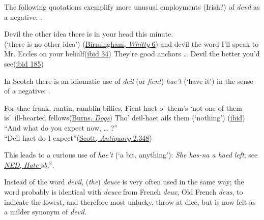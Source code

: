 The following quotations exemplify more unusual employments (Irish?) of \textit{devil} as a negative: .

\ea \label{ex:04-183}
\ea
Devil the other idea there is in your head this minute.\\(`there is no other idea') \hfill(\href{https://archive.org/details/advofdrwhitty00birmiala/page/n17/mode/2up?q=\%22Devil+the+other+idea+there\%22&view=theater}{Birmingham, \textit{Whitty} 6})
\ex
and devil the word I'll speak to Mr. Eccles on your behalf\hfill(\href{https://archive.org/details/advofdrwhitty00birmiala/page/34/mode/2up?q=\%22devil+the+word+I%27ll+speak%22}{ibid 34})
\ex
They're good anchors {\dots} Devil the better you'd see\hfill(\href{https://archive.org/details/advofdrwhitty00birmiala/page/184/mode/2up?q=%22They%27re+good+anchors%2C%22&view=theater}{ibid 185}) %
\z
\z

In Scotch there is an idiomatic use of \textit{deil} (or \textit{fient}) \textit{hae't} (`have it') in the sense of a negative: .

\ea \label{ex:04-186}
\ea
For thae frank, rantin, ramblin billies, Fient haet o' them's \ob`not one of them is'\cb ~ill-hearted fellows\hfill(\href{https://www.scottishpoetrylibrary.org.uk/poem/the-twa-dogs/}{Burns, \textit{Dogs}})
\ex
Tho' deil-haet ails them \phantom{x} (`nothing') \hfill(\href{https://www.scottishpoetrylibrary.org.uk/poem/the-twa-dogs/}{ibid}) %
\ex
``And what do you expect now, {\dots} ?''\\``Deil haet do I expect''\hfill(\href{https://archive.org/details/cewaverleynovels03scotuoft/page/406/mode/2up?view=theater&q=\%22what+do+you+expect+now%22}{Scott, \textit{Antiquary} 2.348}) %
\z
\z

This leads to a curious use of \textit{hae't} (`a bit, anything'): \textit{She has-na a haed left}; see \href{https://archive.org/details/newenglishdict05murrmiss/page/n137/mode/2up?view=theater}{\textit{NED}, \textit{Hate} $sb.^{2}$}.%

Instead of the word \textit{devil}, (\textit{the}) \textit{deuce} is very often used in the same way; the word probably is identical with \textit{deuce} from French \textit{deux}, Old French \textit{deus}, to indicate the lowest, and therefore most unlucky, throw at dice, but is now felt as a milder synonym of \textit{devil}.


